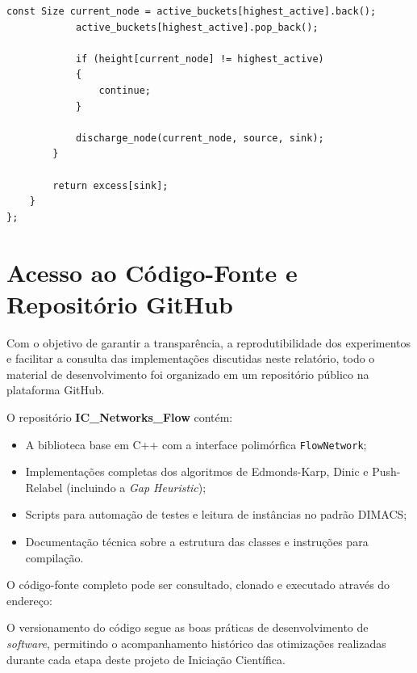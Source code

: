 \documentclass[12pt,a4paper]{article}
\begin{document}
\begin{lstlisting}[caption={Implementação em C++ da classe \lstinline{PushRelabelImproved}, otimizada empiricamente com a Heurística de Lacuna (\textit{Gap Heuristic}).}, label={lst:push_relabel_improved}]
			const Size current_node = active_buckets[highest_active].back();
			active_buckets[highest_active].pop_back();

			if (height[current_node] != highest_active)
			{
				continue;
			}

			discharge_node(current_node, source, sink);
		}

		return excess[sink];
	}
};
\end{lstlisting}

\section{Acesso ao Código-Fonte e Repositório GitHub}
\label{ap:github}

Com o objetivo de garantir a transparência, a reprodutibilidade dos experimentos e facilitar a consulta das implementações discutidas neste relatório, todo o material de desenvolvimento foi organizado em um repositório público na plataforma GitHub.

O repositório \textbf{IC\_Networks\_Flow} contém:
\begin{itemize}
    \item A biblioteca base em C++ com a interface polimórfica \lstinline{FlowNetwork};
    \item Implementações completas dos algoritmos de Edmonds-Karp, Dinic e Push-Relabel (incluindo a \textit{Gap Heuristic});
    \item Scripts para automação de testes e leitura de instâncias no padrão DIMACS;
    \item Documentação técnica sobre a estrutura das classes e instruções para compilação.
\end{itemize}

O código-fonte completo pode ser consultado, clonado e executado através do endereço:

\vspace{0.4cm}
\begin{center}
\end{center}
\vspace{0.4cm}

O versionamento do código segue as boas práticas de desenvolvimento de \textit{software}, permitindo o acompanhamento histórico das otimizações realizadas durante cada etapa deste projeto de Iniciação Científica.
\end{document}
